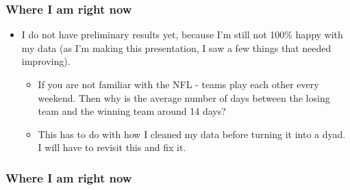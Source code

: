 \documentclass[t]{beamer}
\begin{document}
\begin{frame}
\frametitle{Where I am right now}

\begin{itemize}
\item<1->{I do not have preliminary results yet, because I'm still not 100\% happy with my data (as I'm making this presentation, I saw a few things that needed improving).}
	\begin{itemize}
	\item<2->{If you are not familiar with the NFL - teams play each other every weekend. Then why is the average number of days between the losing team and the winning team around 14 days?}
	\item<3->{This has to do with how I cleaned my data before turning it into a dyad. I will have to revisit this and fix it.}

	\end{itemize}
\end{itemize}
\end{frame}	

\begin{frame}
\frametitle{Where I am right now}
\end{frame}
\end{document}
